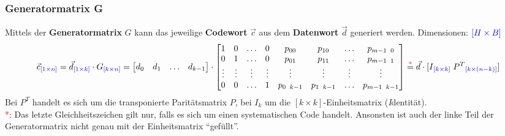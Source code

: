 \subsubsection{Generatormatrix G}
Mittels der \textbf{Generatormatrix} $G$ kann das jeweilige \textbf{Codewort} $\vec{c}$ aus dem \textbf{Datenwort} $\vec{d}$
generiert werden. Dimensionen: $\textcolor{blue}{[H\times B]}$
$$ \vec{c}\textcolor{blue}{_{[1 \times n]}} =
\vec{d}\textcolor{blue}{_{[1 \times k]}} \cdot G\textcolor{blue}{_{[k \times n]}} =
                \begin{bmatrix} d_0 & d_1 & \ldots & d_{k-1} \end{bmatrix} 
				\cdot \begin{bmatrix} 
					1 & 0 & \ldots & 0 & p_{00} & p_{10} & \ldots & p_{m-1 \;\; 0} \\              
					0 & 1 & \ldots & 0 & p_{01} & p_{11} & \ldots & p_{m-1 \;\; 1} \\
					\vdots & \vdots & \vdots & \vdots & \vdots & \vdots & \vdots & \vdots \\
					0 & 0 & \ldots & 1 & p_{0 \;\; k-1} & p_{1 \;\; k-1} & \ldots & p_{m-1 \;\; k-1} \\
				\end{bmatrix} \overset{\textcolor{red}{*}}{=} \vec{d} \cdot [I\textcolor{blue}{_{[k \times k]}} \;
				P^T\textcolor{blue}{_{[k \times (n-k)]}}] $$ Bei $P^T$ handelt es sich um die transponierte
				Paritätsmatrix $P$, bei $I_k$ um die $[k \times k]$-Einheitsmatrix (\emph{I}dentität). \\
\textcolor{red}{*}: Das letzte Gleichheitszeichen gilt nur, falls
es sich um einen systematischen Code handelt. Ansonsten ist auch der linke Teil der Generatormatrix
nicht genau mit der Einheitsmatrix ``gefüllt''.

